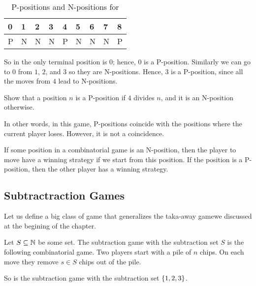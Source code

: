 \begin{table}[h!]
  \centering
  \begin{tabular}{l l l l l l l l l}
      \toprule
      0 & 1 & 2 & 3 & 4 & 5 & 6 & 7 & 8 \\
      \midrule
      P & N & N & N & P & N & N & N & P \\
      \bottomrule
  \end{tabular}
  \caption{P-positions and N-positions for }
  \label{table:take-away-21-3-2-1}
\end{table}


So in  the only terminal position is $0$;
hence, $0$ is a P-position. Similarly we can go to $0$ from $1$, $2$, and
$3$ so they are N-positions. Hence, $3$ is a P-position,
since all the moves from $4$ lead to N-positions.
\begin{exercise}
  Show that a position $n$ is a P-position if $4$ divides $n$, and
  it is an N-position otherwise.
\end{exercise}

In other words, in this game, P-positions coincide with the positions where the
current player loses. However, it is not a coincidence.
\begin{theorem}
  If some position in a combinatorial game is an N-position, then the player to
  move have a winning strategy if we start from this position. If the position
  is a P-position, then the other player has a winning strategy.
\end{theorem}

\subsection{Subtractraction Games}
Let us define a big class of game that generalizes the taka-away gamewe
discussed at the begining of the chapter.
\begin{game}
  Let $S \subseteq {\mathbb{N}}$ be some set. The subtraction game with the subtraction
  set $S$ is the following combinatorial game.
  Two players start with a pile of $n$ chips.
  On each move they remove $s \in S$ chips out of the pile.
\end{game}

So  is the subtraction game with the subtraction
set $\set{1, 2, 3}$.

